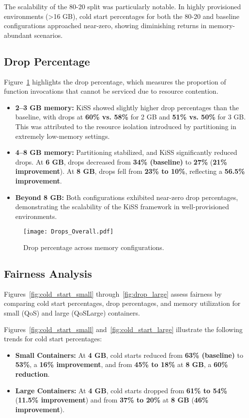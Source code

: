 The scalability of the 80-20 split was particularly notable. In highly provisioned environments (>16 GB), cold start percentages for both the 80-20 and baseline configurations approached near-zero, showing diminishing returns in memory-abundant scenarios.

\subsection{Drop Percentage}

Figure~\ref{fig:drop_percentage} highlights the drop percentage, which measures the proportion of function invocations that cannot be serviced due to resource contention.
\begin{itemize}
    \item \textbf{2–3 GB memory:} KiSS showed slightly higher drop percentages than the baseline, with drops at \textbf{60\% vs. 58\%} for 2 GB and \textbf{51\% vs. 50\%} for 3 GB. This was attributed to the resource isolation introduced by partitioning in extremely low-memory settings.
    \item \textbf{4–8 GB memory:} Partitioning stabilized, and KiSS significantly reduced drops. At \textbf{6 GB}, drops decreased from \textbf{34\% (baseline)} to \textbf{27\%} (\textbf{21\% improvement}). At \textbf{8 GB}, drops fell from \textbf{23\% to 10\%}, reflecting a \textbf{56.5\% improvement}.
    \item \textbf{Beyond 8 GB:} Both configurations exhibited near-zero drop percentages, demonstrating the scalability of the KiSS framework in well-provisioned environments.
\end{itemize}

\begin{figure}[h]
    \centering
    \texttt{[image: Drops\_Overall.pdf]}
    \caption{Drop percentage across memory configurations.}
    \label{fig:drop_percentage}
\end{figure}


\subsection{Fairness Analysis}

Figures~\ref{fig:cold_start_small} through~\ref{fig:drop_large} assess fairness by comparing cold start percentages, drop percentages, and memory utilization for small (QoS) and large (QoSLarge) containers.

Figures~\ref{fig:cold_start_small} and~\ref{fig:cold_start_large} illustrate the following trends for cold start percentages:
    \begin{itemize}
        \item \textbf{Small Containers:} At \textbf{4 GB}, cold starts reduced from \textbf{63\% (baseline)} to \textbf{53\%}, a \textbf{16\% improvement}, and from \textbf{45\% to 18\%} at \textbf{8 GB}, a \textbf{60\% reduction}.
        \item \textbf{Large Containers:} At \textbf{4 GB}, cold starts dropped from \textbf{61\% to 54\%} (\textbf{11.5\% improvement}) and from \textbf{37\% to 20\%} at \textbf{8 GB} (\textbf{46\% improvement}).
    \end{itemize}
   

